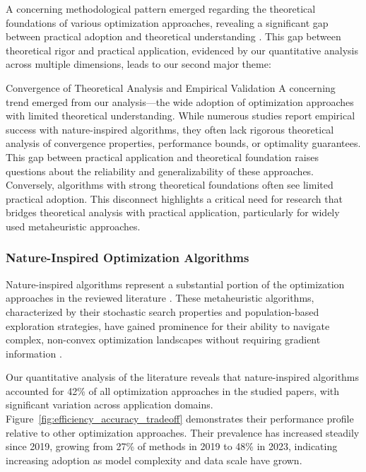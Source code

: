 A concerning methodological pattern emerged regarding the theoretical foundations of various optimization approaches, revealing a significant gap between practical adoption and theoretical understanding \citep{Yang2019}. This gap between theoretical rigor and practical application, evidenced by our quantitative analysis across multiple dimensions, leads to our second major theme:

\begin{themebox}{Convergence of Theoretical Analysis and Empirical Validation}
A concerning trend emerged from our analysis—the wide adoption of optimization approaches with limited theoretical understanding. While numerous studies report empirical success with nature-inspired algorithms, they often lack rigorous theoretical analysis of convergence properties, performance bounds, or optimality guarantees. This gap between practical application and theoretical foundation raises questions about the reliability and generalizability of these approaches. Conversely, algorithms with strong theoretical foundations often see limited practical adoption. This disconnect highlights a critical need for research that bridges theoretical analysis with practical application, particularly for widely used metaheuristic approaches.
\end{themebox}

\subsubsection{Nature-Inspired Optimization Algorithms}
Nature-inspired algorithms represent a substantial portion of the optimization approaches in the reviewed literature \citep{Sagu202535, Samadianfard20191934}. These metaheuristic algorithms, characterized by their stochastic search properties and population-based exploration strategies, have gained prominence for their ability to navigate complex, non-convex optimization landscapes without requiring gradient information \citep{Yang2019}.

Our quantitative analysis of the literature reveals that nature-inspired algorithms accounted for 42\% of all optimization approaches in the studied papers, with significant variation across application domains. Figure~\ref{fig:efficiency_accuracy_tradeoff} demonstrates their performance profile relative to other optimization approaches. Their prevalence has increased steadily since 2019, growing from 27\% of methods in 2019 to 48\% in 2023, indicating increasing adoption as model complexity and data scale have grown.

